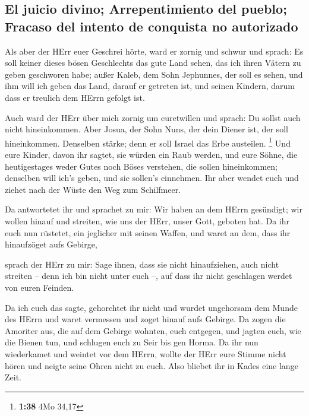 \hypertarget{el-juicio-divino-arrepentimiento-del-pueblo-fracaso-del-intento-de-conquista-no-autorizado}{%
\subsection{El juicio divino; Arrepentimiento del pueblo; Fracaso del
intento de conquista no
autorizado}\label{el-juicio-divino-arrepentimiento-del-pueblo-fracaso-del-intento-de-conquista-no-autorizado}}

 Als aber der HErr euer Geschrei hörte, ward er zornig
und schwur und sprach:  Es soll keiner dieses bösen
Geschlechts das gute Land sehen, das ich ihren Vätern zu geben
geschworen habe;  außer Kaleb, dem Sohn Jephunnes, der
soll es sehen, und ihm will ich geben das Land, darauf er getreten ist,
und seinen Kindern, darum dass er treulich dem HErrn gefolgt ist.

 Auch ward der HErr über mich zornig um euretwillen und
sprach: Du sollst auch nicht hineinkommen.  Aber Josua,
der Sohn Nuns, der dein Diener ist, der soll hineinkommen. Denselben
stärke; denn er soll Israel das Erbe austeilen. \footnote{\textbf{1:38}
  4Mo 34,17}  Und eure Kinder, davon ihr sagtet, sie
würden ein Raub werden, und eure Söhne, die heutigestages weder Gutes
noch Böses verstehen, die sollen hineinkommen; denselben will ich's
geben, und sie sollen's einnehmen.  Ihr aber wendet euch
und ziehet nach der Wüste den Weg zum Schilfmeer.

 Da antwortetet ihr und sprachet zu mir: Wir haben an dem
HErrn gesündigt; wir wollen hinauf und streiten, wie uns der HErr, unser
Gott, geboten hat. Da ihr euch nun rüstetet, ein jeglicher mit seinen
Waffen, und waret an dem, dass ihr hinaufzöget aufs Gebirge,

 sprach der HErr zu mir: Sage ihnen, dass sie nicht
hinaufziehen, auch nicht streiten -- denn ich bin nicht unter euch --,
auf dass ihr nicht geschlagen werdet von euren Feinden.

 Da ich euch das sagte, gehorchtet ihr nicht und wurdet
ungehorsam dem Munde des HErrn und waret vermessen und zoget hinauf aufs
Gebirge.  Da zogen die Amoriter aus, die auf dem Gebirge
wohnten, euch entgegen, und jagten euch, wie die Bienen tun, und
schlugen euch zu Seir bis gen Horma.  Da ihr nun
wiederkamet und weintet vor dem HErrn, wollte der HErr eure Stimme nicht
hören und neigte seine Ohren nicht zu euch.  Also bliebet
ihr in Kades eine lange Zeit.

